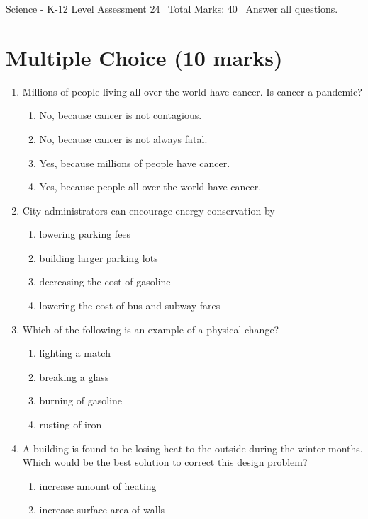 \documentclass[12pt]{article}
\begin{document}
\begin{center}
Science - K-12 Level Assessment 24 \
Total Marks: 40 \
Answer all questions.
\end{center}

\section*{Multiple Choice (10 marks)}
\begin{enumerate}[label=\arabic*.]
\item Millions of people living all over the world have cancer. Is cancer a pandemic?
\begin{enumerate}[label=(\alph*)]
    \item No, because cancer is not contagious.
    \item No, because cancer is not always fatal.
    \item Yes, because millions of people have cancer.
    \item Yes, because people all over the world have cancer.
\end{enumerate}
\item City administrators can encourage energy conservation by
\begin{enumerate}[label=(\alph*)]
    \item lowering parking fees
    \item building larger parking lots
    \item decreasing the cost of gasoline
    \item lowering the cost of bus and subway fares
\end{enumerate}
\item Which of the following is an example of a physical change?
\begin{enumerate}[label=(\alph*)]
    \item lighting a match
    \item breaking a glass
    \item burning of gasoline
    \item rusting of iron
\end{enumerate}
\item A building is found to be losing heat to the outside during the winter months. Which would be the best solution to correct this design problem?
\begin{enumerate}[label=(\alph*)]
    \item increase amount of heating
    \item increase surface area of walls

\end{enumerate}
\end{enumerate}
\end{document}
